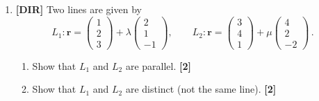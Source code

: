 \documentclass[11pt,a4paper]{article}
\begin{document}
\begin{enumerate}
\item \textbf{[DIR]} Two lines are given by
\[
L_1 : \mathbf{r} = \begin{pmatrix} 1 \\ 2 \\ 3 \end{pmatrix} + \lambda\begin{pmatrix} 2 \\ 1 \\ -1 \end{pmatrix},
\qquad
L_2 : \mathbf{r} = \begin{pmatrix} 3 \\ 4 \\ 1 \end{pmatrix} + \mu\begin{pmatrix} 4 \\ 2 \\ -2 \end{pmatrix}\,.
\]
\begin{enumerate}
  \item Show that $L_1$ and $L_2$ are parallel. \hfill{\small\textbf{[2]}}
  \item Show that $L_1$ and $L_2$ are distinct (not the same line). \hfill{\small\textbf{[2]}}
\end{enumerate}

\end{enumerate}
\end{document}
